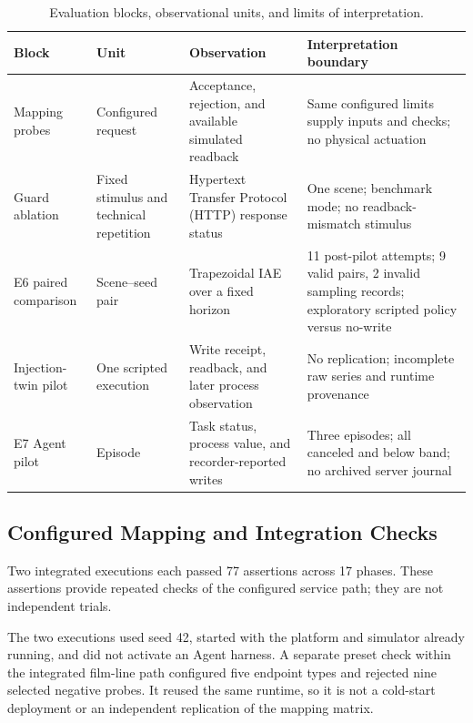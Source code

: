 \begin{table}[!t]
\centering
\caption{Evaluation blocks, observational units, and limits of interpretation.}
\label{tab:evidence-scope}
\footnotesize
\setlength{\tabcolsep}{5pt}
\begin{tabularx}{\textwidth}{@{}>{\raggedright\arraybackslash}p{}>{\raggedright\arraybackslash}p{}>{\raggedright\arraybackslash}p{}X@{}}
\toprule
Block & Unit & Observation & Interpretation boundary \\
\midrule
Mapping probes & Configured request & Acceptance, rejection, and available simulated readback & Same configured limits supply inputs and checks; no physical actuation \\
Guard ablation & Fixed stimulus and technical repetition & Hypertext Transfer Protocol (HTTP) response status & One scene; benchmark mode; no readback-mismatch stimulus \\
E6 paired comparison & Scene--seed pair & Trapezoidal IAE over a fixed horizon & 11 post-pilot attempts; 9 valid pairs, 2 invalid sampling records; exploratory scripted policy versus no-write \\
Injection-twin pilot & One scripted execution & Write receipt, readback, and later process observation & No replication; incomplete raw series and runtime provenance \\
E7 Agent pilot & Episode & Task status, process value, and recorder-reported writes & Three episodes; all canceled and below band; no archived server journal \\
\bottomrule
\end{tabularx}
\end{table}

\subsection{Configured Mapping and Integration Checks}
\label{sec:eval-mapping}
Two integrated executions each passed 77 assertions across 17 phases. These assertions provide repeated checks of the configured service path; they are not independent trials.

The two executions used seed 42, started with the platform and simulator already running, and did not activate an Agent harness. A separate preset check within the integrated film-line path configured five endpoint types and rejected nine selected negative probes. It reused the same runtime, so it is not a cold-start deployment or an independent replication of the mapping matrix.

